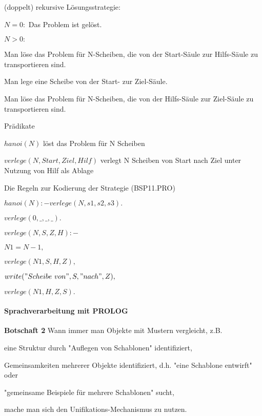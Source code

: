 \documentclass[a4paper]{article}
\renewcommand{\note}[2]{\begin{noteBox} \textbf{#1} #2 \end{noteBox}}
\begin{document}
\begin{multicols}{3}
  (doppelt) rekursive Lösungsstrategie:
  \begin{itemize*}
    \item $N = 0:$ Das Problem ist gelöst.
    \item $N > 0:$
    \begin{enumerate*}
      \item Man löse das Problem für N-Scheiben, die von der Start-Säule zur Hilfs-Säule zu transportieren sind.
      \item Man lege eine Scheibe von der Start- zur Ziel-Säule.
      \item Man löse das Problem für N-Scheiben, die von der Hilfs-Säule zur Ziel-Säule zu transportieren sind.
    \end{enumerate*}
  \end{itemize*}

  Prädikate
  \begin{itemize*}
    \item $hanoi(N)$ löst das Problem für N Scheiben
    \item $verlege(N,Start,Ziel,Hilf)$ verlegt N Scheiben von Start nach Ziel unter Nutzung von Hilf als Ablage
  \end{itemize*}

  Die Regeln zur Kodierung der Strategie (BSP11.PRO)
  \begin{itemize*}
    \item $hanoi( N ) :- verlege( N , s1 , s2 , s3 ).$
    \item $verlege( 0 , \_ , \_ , \_ ).$
    \item $verlege( N , S , Z , H ) :-$
    \begin{itemize*}
      \item $N1 = N - 1,$
      \item $verlege( N1 , S , H , Z ),$
      \item $write("Scheibe\ von ", S," nach ", Z),$
      \item $verlege( N1 , H , Z , S ).$
    \end{itemize*}
  \end{itemize*}

  \paragraph{Sprachverarbeitung mit PROLOG}
  \note{Botschaft  2}{Wann immer man Objekte mit Mustern vergleicht, z.B.
    \begin{enumerate*}
      \item eine Struktur durch "Auflegen von Schablonen" identifiziert,
      \item Gemeinsamkeiten mehrerer Objekte identifiziert, d.h. "eine Schablone entwirft" oder
      \item "gemeinsame Beispiele für mehrere Schablonen" sucht,
    \end{enumerate*}
    mache man sich den Unifikations-Mechanismus zu nutzen.}


\end{multicols}
\end{document}
